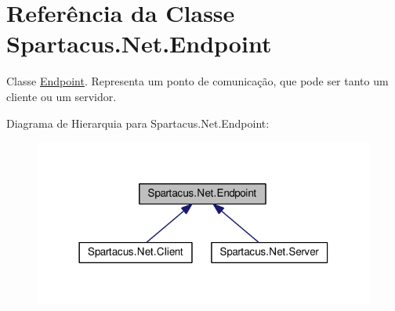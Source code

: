 \hypertarget{classSpartacus_1_1Net_1_1Endpoint}{\section{Referência da Classe Spartacus.\+Net.\+Endpoint}
\label{classSpartacus_1_1Net_1_1Endpoint}
}


Classe \hyperlink{classSpartacus_1_1Net_1_1Endpoint}{Endpoint}. Representa um ponto de comunicação, que pode ser tanto um cliente ou um servidor.  




Diagrama de Hierarquia para Spartacus.\+Net.\+Endpoint\+:\nopagebreak
\begin{figure}[H]
\begin{center}
\leavevmode
\includegraphics[width=318pt]{classSpartacus_1_1Net_1_1Endpoint__inherit__graph}
\end{center}
\end{figure}
